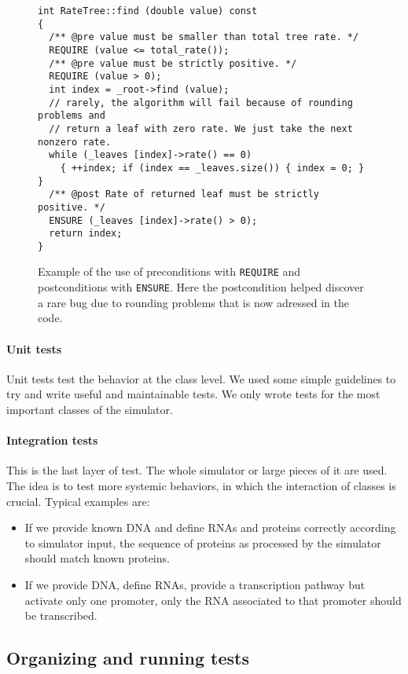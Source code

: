 \begin{figure}[!h]
  \centering
\begin{verbatim}
int RateTree::find (double value) const
{
  /** @pre value must be smaller than total tree rate. */
  REQUIRE (value <= total_rate());
  /** @pre value must be strictly positive. */
  REQUIRE (value > 0);
  int index = _root->find (value);
  // rarely, the algorithm will fail because of rounding problems and
  // return a leaf with zero rate. We just take the next nonzero rate.
  while (_leaves [index]->rate() == 0)
    { ++index; if (index == _leaves.size()) { index = 0; } }
  /** @post Rate of returned leaf must be strictly positive. */
  ENSURE (_leaves [index]->rate() > 0);
  return index;
}
\end{verbatim}
\caption{Example of the use of preconditions with \texttt{REQUIRE} and postconditions with \texttt{ENSURE}.
Here the postcondition helped discover a rare bug due to rounding problems that is now adressed in the code.}
\label{fig:prepostconditions}
\end{figure}

\paragraph{Unit tests}
Unit tests test the behavior at the class level.
We used some simple guidelines to try and write useful and maintainable tests.
We only wrote tests for the most important classes of the simulator.

\paragraph{Integration tests}
This is the last layer of test.
The whole simulator or large pieces of it are used.
The idea is to test more systemic behaviors, in which the interaction of classes is crucial.
Typical examples are:
\begin{itemize}
  \item If we provide known DNA and define RNAs and proteins correctly according to simulator input, the sequence of proteins as processed by the simulator should match known proteins.
  \item If we provide DNA, define RNAs, provide a transcription pathway but activate only one promoter, only the RNA associated to that promoter should be transcribed.
\end{itemize}


\subsection{Organizing and running tests}


